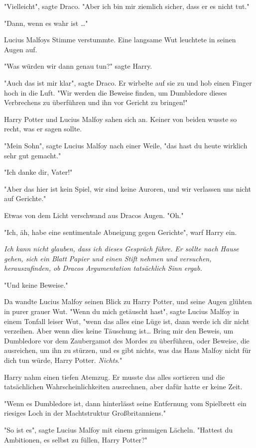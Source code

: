 {"Vielleicht", sagte Draco. "Aber ich bin mir ziemlich sicher, dass er es nicht tut."

"Dann, wenn es wahr ist …"

Lucius Malfoys Stimme verstummte. Eine langsame Wut leuchtete in seinen Augen auf.

"Was würden wir dann genau tun?" sagte Harry.

"Auch das ist mir klar", sagte Draco. Er wirbelte auf sie zu und hob einen Finger hoch in die Luft. "Wir werden die Beweise finden, um Dumbledore dieses Verbrechens zu überführen und ihn vor Gericht zu bringen!"

Harry Potter und Lucius Malfoy sahen sich an. Keiner von beiden wusste so recht, was er sagen sollte.

"Mein Sohn", sagte Lucius Malfoy nach einer Weile, "das hast du heute wirklich sehr gut gemacht."

"Ich danke dir, Vater!"

"Aber das hier ist kein Spiel, wir sind keine Auroren, und wir verlassen uns nicht auf Gerichte."

Etwas von dem Licht verschwand aus Dracos Augen. "Oh."

"Ich, äh, habe eine sentimentale Abneigung gegen Gerichte", warf Harry ein.

\emph{Ich kann nicht glauben, dass ich dieses Gespräch führe. Er sollte nach Hause gehen, sich ein Blatt Papier und einen Stift nehmen und versuchen, herauszufinden, ob Dracos Argumentation tatsächlich Sinn ergab.}

"Und keine Beweise."

Da wandte Lucius Malfoy seinen Blick zu Harry Potter, und seine Augen glühten in purer grauer Wut. "Wenn du mich getäuscht hast", sagte Lucius Malfoy in einem Tonfall leiser Wut, "wenn das alles eine Lüge ist, dann werde ich dir nicht verzeihen. Aber wenn dies keine Täuschung ist… Bring mir den Beweis, um Dumbledore vor dem Zaubergamot des Mordes zu überführen, oder Beweise, die ausreichen, um ihn zu stürzen, und es gibt nichts, was das Haus Malfoy nicht für dich tun würde, Harry Potter. \emph{Nichts}."

Harry nahm einen tiefen Atemzug. Er musste das alles sortieren und die tatsächlichen Wahrscheinlichkeiten ausrechnen, aber dafür hatte er keine Zeit.

"Wenn es Dumbledore ist, dann hinterlässt seine Entfernung vom Spielbrett ein riesiges Loch in der Machtstruktur Großbritanniens."

"So ist es", sagte Lucius Malfoy mit einem grimmigen Lächeln. "Hattest du Ambitionen, es selbst zu füllen, Harry Potter?"

}
